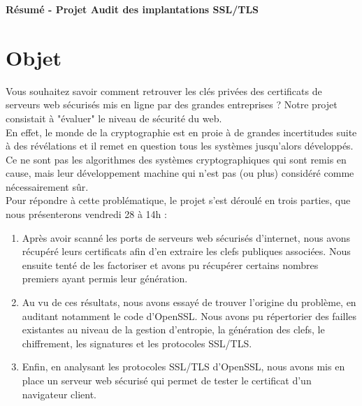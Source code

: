 \documentclass[a4paper,11pt,french]{article}
\author{\hmwkAuthorName}
\date{} %
\newcommand{\hmwkDocName}{Résumé  -  Projet Audit des implantations SSL/TLS} %
\begin{document}
\pagestyle{fancy}

\begin{center}\textbf{\Huge{\hmwkDocName}}\end{center}
	


\section{Objet}
Vous souhaitez savoir comment retrouver les clés privées des certificats de serveurs web sécurisés mis en ligne par des grandes entreprises ? Notre projet consistait à "évaluer" le niveau de sécurité du web.\\


En effet, le monde de la cryptographie est en proie à de grandes incertitudes suite à des révélations et il remet en question tous les systèmes jusqu'alors développés. Ce ne sont pas les algorithmes des systèmes cryptographiques qui sont remis en cause, mais leur développement machine qui n'est pas (ou plus) considéré comme nécessairement sûr.\\




Pour répondre à cette problématique, le projet s'est déroulé en trois parties, que nous présenterons vendredi 28 à 14h :
\begin{enumerate}
\item Après avoir scanné les ports de serveurs web sécurisés d'internet, nous avons récupéré leurs certificats afin d'en extraire les clefs publiques associées. Nous ensuite tenté de les factoriser et avons pu récupérer certains nombres premiers ayant permis leur génération. 

\item Au vu de ces résultats, nous avons essayé de trouver l'origine du problème, en auditant notamment le code d'OpenSSL. Nous avons pu répertorier des failles existantes au niveau de la gestion d'entropie, la génération des clefs, le chiffrement, les signatures et les protocoles SSL/TLS.

\item Enfin, en analysant les protocoles SSL/TLS d'OpenSSL, nous avons mis en place un serveur web sécurisé qui permet de tester le certificat d'un navigateur client.
\end{enumerate}
\end{document}
